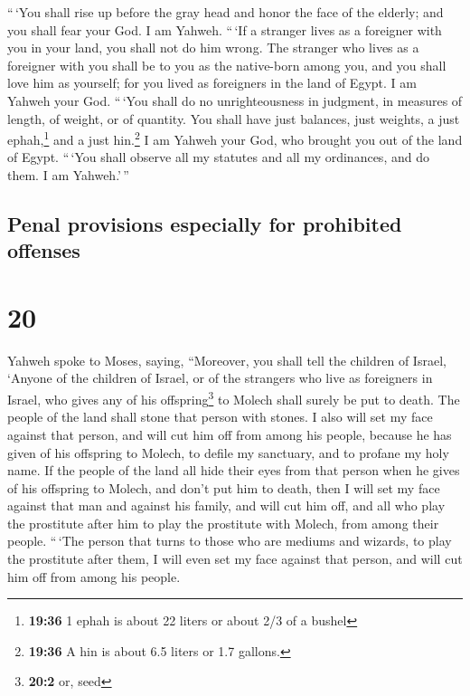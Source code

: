  ``\,`You shall rise up before the gray head and honor
the face of the elderly; and you shall fear your God. I am Yahweh.
 ``\,`If a stranger lives as a foreigner with you in your
land, you shall not do him wrong.  The stranger who lives
as a foreigner with you shall be to you as the native-born among you,
and you shall love him as yourself; for you lived as foreigners in the
land of Egypt. I am Yahweh your God.  ``\,`You shall do
no unrighteousness in judgment, in measures of length, of weight, or of
quantity.  You shall have just balances, just weights, a
just ephah,\footnote{\textbf{19:36} 1 ephah is about 22 liters or about
  2/3 of a bushel} and a just hin.\footnote{\textbf{19:36} A hin is
  about 6.5 liters or 1.7 gallons.} I am Yahweh your God, who brought
you out of the land of Egypt.  ``\,`You shall observe all
my statutes and all my ordinances, and do them. I am Yahweh.'\,''

\hypertarget{penal-provisions-especially-for-prohibited-offenses}{%
\subsection{Penal provisions especially for prohibited
offenses}\label{penal-provisions-especially-for-prohibited-offenses}}

\hypertarget{section-19}{%
\section{20}\label{section-19}}

 Yahweh spoke to Moses, saying,  ``Moreover,
you shall tell the children of Israel, `Anyone of the children of
Israel, or of the strangers who live as foreigners in Israel, who gives
any of his offspring\footnote{\textbf{20:2} or, seed} to Molech shall
surely be put to death. The people of the land shall stone that person
with stones.  I also will set my face against that person,
and will cut him off from among his people, because he has given of his
offspring to Molech, to defile my sanctuary, and to profane my holy
name.  If the people of the land all hide their eyes from
that person when he gives of his offspring to Molech, and don't put him
to death,  then I will set my face against that man and
against his family, and will cut him off, and all who play the
prostitute after him to play the prostitute with Molech, from among
their people.  ``\,`The person that turns to those who are
mediums and wizards, to play the prostitute after them, I will even set
my face against that person, and will cut him off from among his people.

